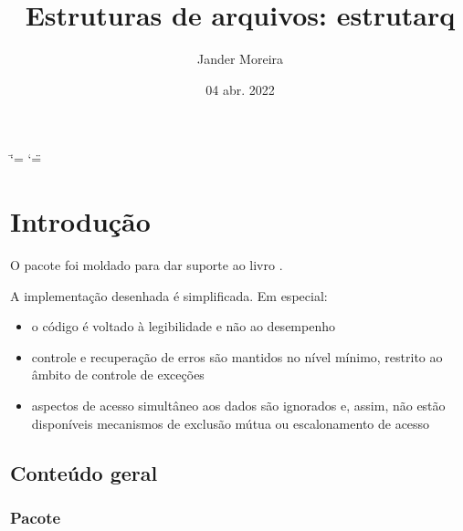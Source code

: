 \documentclass[letterpaper,10pt,brazil]{sphinxmanual}
\title{Estruturas de arquivos: estrutarq}
\date{04 abr. 2022}
\author{Jander Moreira}
\begin{document}
\ifdefined\shorthandoff
  \ifnum\catcode`\=\string=\active\shorthandoff{=}\fi
  \ifnum\catcode`\"=\active{}\fi
\fi

\pagestyle{empty}
\sphinxmaketitle
\pagestyle{plain}
\sphinxtableofcontents
\pagestyle{normal}
\label{\detokenize{index::doc}}



\chapter{Introdução}
\label{\detokenize{index:introducao}}
\sphinxAtStartPar
O pacote  foi moldado para dar suporte ao livro .

\sphinxAtStartPar
A implementação desenhada é simplificada. Em especial:
\begin{itemize}
\item {} 
\sphinxAtStartPar
o código é voltado à legibilidade e não ao desempenho

\item {} 
\sphinxAtStartPar
controle e recuperação de erros são mantidos no nível mínimo, restrito ao âmbito de controle de exceções

\item {} 
\sphinxAtStartPar
aspectos de acesso simultâneo aos dados são ignorados e, assim, não estão disponíveis mecanismos de exclusão mútua ou escalonamento de acesso

\end{itemize}


\section{Conteúdo geral}
\label{\detokenize{index:conteudo-geral}}
\sphinxstepscope


\subsection{Pacote }
\label{\detokenize{estrutarq.dado:pacote-estrutarq-dado}}\label{\detokenize{estrutarq.dado::doc}}
\end{document}
